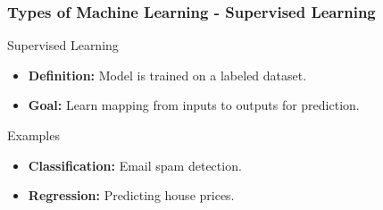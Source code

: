 \documentclass[aspectratio=169]{beamer}
\begin{document}
\begin{frame}[fragile]
    \frametitle{Types of Machine Learning - Supervised Learning}
    \begin{block}{Supervised Learning}
        \begin{itemize}
            \item \textbf{Definition:} Model is trained on a labeled dataset.
            \item \textbf{Goal:} Learn mapping from inputs to outputs for prediction.
        \end{itemize}
    \end{block}
    
    \begin{exampleblock}{Examples}
        \begin{itemize}
            \item \textbf{Classification:} Email spam detection.
            \item \textbf{Regression:} Predicting house prices.
        \end{itemize}
    \end{exampleblock}
\end{frame}
\end{document}
